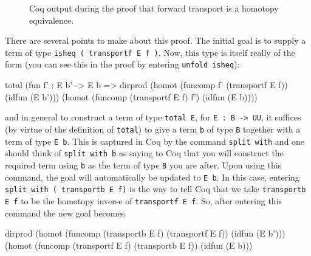 \begin{figure}[ht]
  \caption{Coq output during the proof that forward transport is a
    homotopy equivalence.}
  \label{figure:isheqtransportf}
\end{figure}
There are several points to make about this proof.  The initial goal is
to supply a term of type \verb|isheq ( transportf E f )|.  Now,
this type is itself really of the form (you can see this in the proof
by entering \verb|unfold isheq|):
\begin{center}
  \begin{coqcode}
total (fun f' : E b' -> E b => dirprod (homot (funcomp f' (transportf
E f)) (idfun (E b'))) (homot (funcomp (transportf E f) f') (idfun (E b))))
  \end{coqcode}
\end{center}
and in general to construct a term of type \verb|total E|, for 
\verb|E : B -> UU|, it suffices (by virtue of the definition of 
\verb|total|) to give a term \verb|b| of type
\verb|B| together with a term of type \verb|E b|.  This is
captured in Coq by the command \verb|split with| and one should
think of \verb|split with b| as saying to Coq that you will
construct the required term using \verb|b| as the term of type
\verb|B| you are after.  Upon using this command, the goal will
automatically be updated to \verb|E b|.  In this case, 
entering \verb|split with ( transportb E f)| is the way to tell
Coq that we take \verb|transportb E f| to be the homotopy inverse
of \verb|transportf E f|.  So, after entering this
command the new goal becomes
\begin{center}
  \begin{coqcode}
dirprod 
 (homot (funcomp (transportb E f) (transportf E f)) (idfun (E b')))
 (homot (funcomp (transportf E f) (transportb E f)) (idfun (E b)))
  \end{coqcode}
\end{center}
